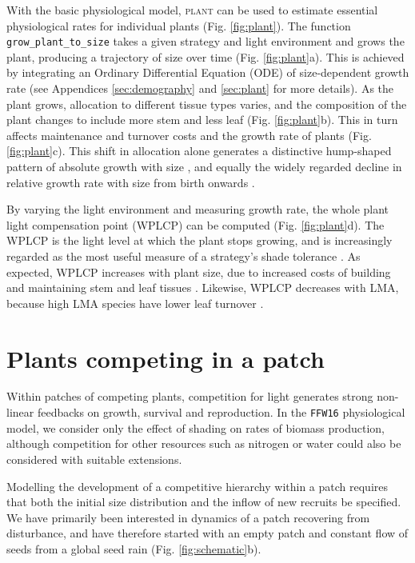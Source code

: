 \documentclass[a4paper,11pt]{article}
\newcommand{\plant}{\textsc{plant}}
\begin{document}
With the basic physiological model, {\plant} can be used to estimate
essential physiological rates for individual plants
(Fig. \ref{fig:plant}). The function \texttt{grow\_plant\_to\_size}
takes a given strategy and light environment and grows the plant,
producing a trajectory of size over time (Fig. \ref{fig:plant}a). This
is achieved by integrating an Ordinary Differential Equation (ODE) of
size-dependent growth rate (see Appendices \ref{sec:demography} and
\ref{sec:plant} for more details). As the plant grows, allocation to
different tissue types varies, and the composition of the plant
changes to include more stem and less leaf
(Fig. \ref{fig:plant}b). This in turn affects maintenance and turnover
costs and the growth rate of plants (Fig. \ref{fig:plant}c).  This
shift in allocation alone generates a distinctive hump-shaped pattern
of absolute growth with size \citep{King-2011}, and equally the widely
regarded decline in relative growth rate with size from birth onwards
\citep{Enquist-2007}.

By varying the light environment and measuring growth rate, the whole
plant light compensation point (WPLCP) can be computed (Fig.
\ref{fig:plant}d). The WPLCP is the light level at which the plant 
stops growing, and is increasingly regarded as the most useful
measure of a strategy's shade tolerance
\citep{Givnish-1988, Baltzer-2007, Lusk-2013}. As expected, WPLCP
increases with plant size, due to increased costs of building and
maintaining stem and leaf tissues \citep{Givnish-1988}. Likewise, WPLCP
decreases with LMA, because high LMA species have lower leaf turnover
\citep{Baltzer-2007, Lusk-2013}.

\section{Plants competing in a patch}

Within patches of competing plants, competition for light generates
strong non-linear feedbacks on growth, survival and reproduction. In the
\texttt{FFW16} physiological model, we consider only the effect of
shading on rates of biomass production, although competition for other
resources such as nitrogen or water could also be considered with
suitable extensions.

Modelling the development of a competitive hierarchy within a patch
requires that both the initial size distribution and the inflow of new
recruits be specified. We have primarily been interested in dynamics of
a patch recovering from disturbance, and have therefore started with an
empty patch and constant flow of seeds from a global seed rain (Fig.
\ref{fig:schematic}b).
\end{document}
